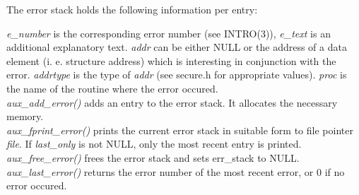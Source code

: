 The error stack holds the following information per entry:

{\em e\_number} is the corresponding error number (see INTRO(3)), {\em e\_text} is an additional
explanatory text. {\em addr} can be either NULL or the address of a data element (i. e. 
structure address) which is interesting in conjunction with the error. {\em addrtype} is the
type of {\em addr} (see secure.h for appropriate values). {\em proc} is the name of the 
routine where the error occured.
\\ [1em]
{\em aux\_add\_error()} adds an entry to the error stack. It allocates the necessary memory.
\\ [1em]
{\em aux\_fprint\_error()} prints the current error stack in suitable form to file pointer {\em file}.
If {\em last\_only} is not NULL, only the most recent entry is printed.
\\ [1em]
{\em aux\_free\_error()} frees the error stack and sets err\_stack to NULL.
\\ [1em]
{\em aux\_last\_error()} returns the error number of the most recent error, or 0 if
no error occured.

